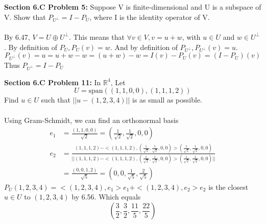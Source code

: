 \documentclass[12pt]{article}
\begin{document}
\vspace{\baselineskip}
\vspace{\baselineskip}
\vspace{\baselineskip}

\noindent \textbf{Section 6.C Problem 5: }Suppose V is finite-dimensional and U is a subspace of V. Show that $P_{U^\perp} = I - P_U$, where I is the identity operator of V. 
\\ \\
By 6.47, $V = U \oplus U^\perp$.  This means that $\forall v \in V, v = u + w$, with $u \in U$ and $w \in U^\perp$.  By definition of $P_U, P_U(v) = w$. And by definition of $P_{U^\perp}, P_{U^\perp}(v) = u$.  
	$$
	P_{U^\perp}(v) = u = u + w - w = (u + w) - w = I(v) -P_{U}(v) = (I - P_{U})(v)
	$$
Thus $P_{U^\perp} = I - P_U$

\vspace{\baselineskip}
\vspace{\baselineskip}
\vspace{\baselineskip}

\noindent \textbf{Section 6.C Problem 11: }In $\mathbb{R}^4$, Let 
	$$
	U = \text{span}\left( (1,1,0,0),(1,1,1,2) \right)
	$$
Find $u \in U$ such that $|| u - (1,2,3,4) ||$ is as small as possible.
\\ \\
Using Gram-Schmidt, we can find an orthonormal basis
	\begin{align*}
		e_1 &= \frac{(1,1,0,0)}{\sqrt{2}} = (\frac{1}{\sqrt{2}},\frac{1}{\sqrt{2}}, 0, 0) \\
		e_2 &= \frac{(1,1,1,2) - <(1,1,1,2),(\frac{1}{\sqrt{2}},\frac{1}{\sqrt{2}}, 0, 0)>(\frac{1}{\sqrt{2}},\frac{1}{\sqrt{2}}, 0, 0)}{|| (1,1,1,2) - <(1,1,1,2),(\frac{1}{\sqrt{2}},\frac{1}{\sqrt{2}}, 0, 0)>(\frac{1}{\sqrt{2}},\frac{1}{\sqrt{2}}, 0, 0) ||} \\
		&= \frac{(0,0,1,2)}{\sqrt{5}} = (0,0,\frac{1}{\sqrt{5}}, \frac{2}{\sqrt{5}})
	\end{align*}
$P_U(1,2,3,4) = <(1,2,3,4),e_1>e_1 + <(1,2,3,4),e_2>e_2$ is the closest $u \in U$ to $(1,2,3,4)$ by 6.56.  Which equals 
$$
(\frac{3}{2},\frac{3}{2},\frac{11}{5},\frac{22}{5})
$$ 
\end{document}
